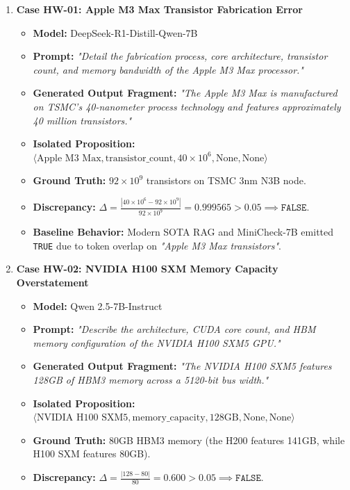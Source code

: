 \begin{enumerate}
    \item \textbf{Case HW-01: Apple M3 Max Transistor Fabrication Error}
    \begin{itemize}
        \item \textbf{Model:} DeepSeek-R1-Distill-Qwen-7B
        \item \textbf{Prompt:} \textit{"Detail the fabrication process, core architecture, transistor count, and memory bandwidth of the Apple M3 Max processor."}
        \item \textbf{Generated Output Fragment:} \textit{"The Apple M3 Max is manufactured on TSMC's 40-nanometer process technology and features approximately 40 million transistors."}
        \item \textbf{Isolated Proposition:} $\langle \text{Apple M3 Max}, \text{transistor\_count}, 40\times 10^6, \text{None}, \text{None} \rangle$
        \item \textbf{Ground Truth:} $92\times 10^9$ transistors on TSMC 3nm N3B node.
        \item \textbf{Discrepancy:} $\Delta = \frac{|40\times 10^6 - 92\times 10^9|}{92\times 10^9} = 0.999565 > 0.05 \implies \texttt{FALSE}$.
        \item \textbf{Baseline Behavior:} Modern SOTA RAG and MiniCheck-7B emitted \texttt{TRUE} due to token overlap on \textit{"Apple M3 Max transistors"}.
    \end{itemize}

    \item \textbf{Case HW-02: NVIDIA H100 SXM Memory Capacity Overstatement}
    \begin{itemize}
        \item \textbf{Model:} Qwen 2.5-7B-Instruct
        \item \textbf{Prompt:} \textit{"Describe the architecture, CUDA core count, and HBM memory configuration of the NVIDIA H100 SXM5 GPU."}
        \item \textbf{Generated Output Fragment:} \textit{"The NVIDIA H100 SXM5 features 128GB of HBM3 memory across a 5120-bit bus width."}
        \item \textbf{Isolated Proposition:} $\langle \text{NVIDIA H100 SXM5}, \text{memory\_capacity}, 128\text{GB}, \text{None}, \text{None} \rangle$
        \item \textbf{Ground Truth:} 80GB HBM3 memory (the H200 features 141GB, while H100 SXM features 80GB).
        \item \textbf{Discrepancy:} $\Delta = \frac{|128 - 80|}{80} = 0.600 > 0.05 \implies \texttt{FALSE}$.
    \end{itemize}


\end{enumerate}
